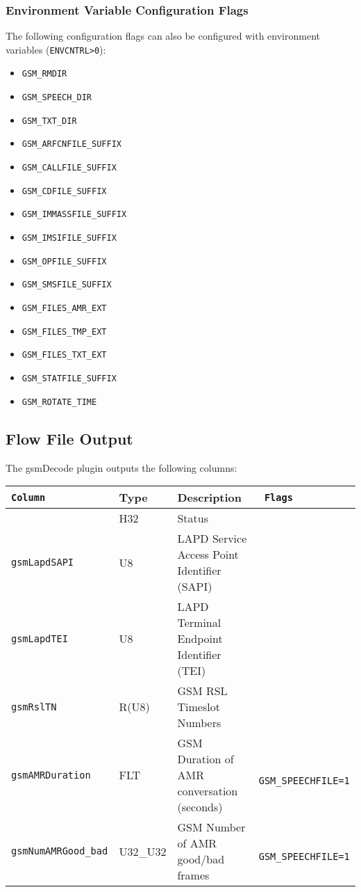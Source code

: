 \documentclass[documentation]{subfiles}
\begin{document}
\subsubsection{Environment Variable Configuration Flags}
The following configuration flags can also be configured with environment variables ({\tt ENVCNTRL>0}):
\begin{itemize}
    \item {\tt GSM\_RMDIR}
    \item {\tt GSM\_SPEECH\_DIR}
    \item {\tt GSM\_TXT\_DIR}
    \item {\tt GSM\_ARFCNFILE\_SUFFIX}
    \item {\tt GSM\_CALLFILE\_SUFFIX}
    \item {\tt GSM\_CDFILE\_SUFFIX}
    \item {\tt GSM\_IMMASSFILE\_SUFFIX}
    \item {\tt GSM\_IMSIFILE\_SUFFIX}
    \item {\tt GSM\_OPFILE\_SUFFIX}
    \item {\tt GSM\_SMSFILE\_SUFFIX}
    \item {\tt GSM\_FILES\_AMR\_EXT}
    \item {\tt GSM\_FILES\_TMP\_EXT}
    \item {\tt GSM\_FILES\_TXT\_EXT}
    \item {\tt GSM\_STATFILE\_SUFFIX}
    \item {\tt GSM\_ROTATE\_TIME}
\end{itemize}

\subsection{Flow File Output}
The gsmDecode plugin outputs the following columns:
\begin{longtable}{>{\tt}lll>{\tt\small}l}
    \toprule
    {\bf Column}       & {\bf Type} & {\bf Description}                           & {\bf Flags}\\
    \midrule\endhead%
    \nameref{gsmStat}  & H32        & Status                                      & \\
    gsmLapdSAPI        & U8         & LAPD Service Access Point Identifier (SAPI) & \\
    gsmLapdTEI         & U8         & LAPD Terminal Endpoint Identifier (TEI)     & \\
    gsmRslTN           & R(U8)      & GSM RSL Timeslot Numbers                    & \\
    gsmAMRDuration     & FLT        & GSM Duration of AMR conversation (seconds)  & GSM\_SPEECHFILE=1\\
    gsmNumAMRGood\_bad & U32\_U32   & GSM Number of AMR good/bad frames           & GSM\_SPEECHFILE=1\\
    \bottomrule
\end{longtable}
\end{document}
